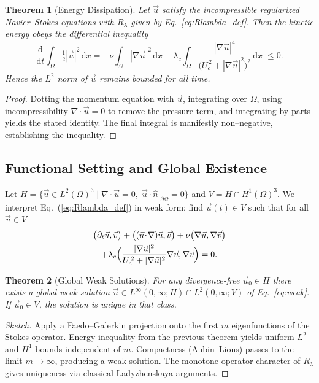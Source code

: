 \documentclass[12pt]{report}
\newtheorem{theorem}{Theorem}[chapter]
\newcommand{\dd}{\mathrm{d}}
\begin{document}
\begin{theorem}[Energy Dissipation]
Let $\vec{u}$ satisfy the incompressible regularized Navier--Stokes equations with $R_\lambda$ given by Eq.~\eqref{eq:Rlambda_def}.  Then the kinetic energy obeys the differential inequality
\[
    \frac{\dd}{\dd t}\int_{\Omega}\!\tfrac12|\vec{u}|^2\,\dd x 
      = -\nu\!\int_{\Omega}\!|\nabla\vec{u}|^2\,\dd x
        -\lambda_c\!\int_{\Omega}\!\frac{|\nabla\vec{u}|^4}{\bigl(U_c^{\,2}+|\nabla\vec{u}|^2\bigr)^{2}}\,\dd x\;\le 0.
\]
Hence the $L^2$ norm of $\vec{u}$ remains bounded for all time.
\end{theorem}

\begin{proof}
Dotting the momentum equation with $\vec{u}$, integrating over $\Omega$, using incompressibility $\nabla\!\cdot\vec{u}=0$ to remove the pressure term, and integrating by parts yields the stated identity.  The final integral is manifestly non--negative, establishing the inequality.
\end{proof}

\subsection{Functional Setting and Global Existence}\label{subsec:global_exist}
Let $H=\{\vec{u}\in L^2(\Omega)^3\mid \nabla\!\cdot\vec{u}=0,\;\vec{u}\cdot\hat n|_{\partial\Omega}=0\}$ and $V=H\cap H^1(\Omega)^3$.  We interpret Eq.~(\ref{eq:Rlambda_def}) in weak form: find $\vec{u}(t)\in V$ such that for all $\vec{v}\in V$
\begin{multline}\label{eq:weak}
    \bigl(\partial_t\vec{u},\vec{v}\bigr)+\bigl((\vec{u}\!\cdot\!\nabla)\vec{u},\vec{v}\bigr)+\nu\bigl(\nabla\vec{u},\nabla\vec{v}\bigr)\\
    +\lambda_c\Bigl(\frac{|\nabla\vec{u}|^2}{U_c^{\,2}+|\nabla\vec{u}|^2}\nabla\vec{u},\nabla\vec{v}\Bigr)=0.
\end{multline}
\begin{theorem}[Global Weak Solutions]
For any divergence-free $\vec{u}_0\in H$ there exists a global weak solution $\vec{u}\in L^\infty(0,\infty;H)\cap L^2(0,\infty;V)$ of Eq.~\eqref{eq:weak}.  If $\vec{u}_0\in V$, the solution is unique in that class.
\end{theorem}
\begin{proof}[Sketch]
Apply a Faedo–Galerkin projection onto the first $m$ eigenfunctions of the Stokes operator.  Energy inequality from the previous theorem yields uniform $L^2$ and $H^1$ bounds independent of $m$.  Compactness (Aubin–Lions) passes to the limit $m\to\infty$, producing a weak solution.  The monotone-operator character of $R_\lambda$ gives uniqueness via classical Ladyzhenskaya arguments.
\end{proof}
\end{document}
